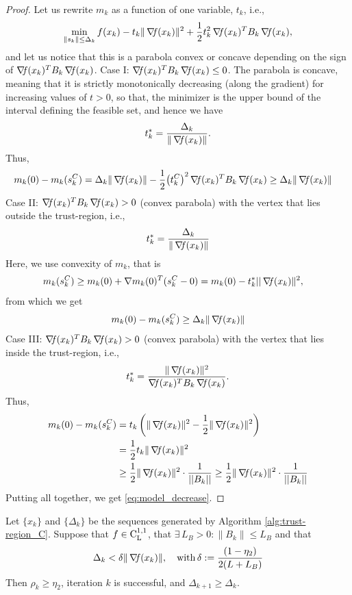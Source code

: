 \documentclass[10pt,a4paper]{article}
\begin{document}
\begin{proof}
	Let us rewrite $m_k$ as a function of one variable, $t_k$, i.e., 
	$$\min_{\|s_k\| \leq \Delta_k} f(x_k) -t_k \|\operatorname*{\mathit{\nabla \!f}}(x_k)\|^2 + \frac{1}{2}t_k^2\operatorname*{\mathit{\nabla \!f}}(x_k)^T B_k\operatorname*{\mathit{\nabla \!f}}(x_k),$$
	and let us notice that this is a parabola convex or concave depending on the sign of $\operatorname*{\mathit{\nabla \!f}}(x_k)^T B_k\operatorname*{\mathit{\nabla \!f}}(x_k)$. 
	Case I: $\operatorname*{\mathit{\nabla \!f}}(x_k)^T B_k \operatorname*{\mathit{\nabla \!f}}(x_k) \leq 0$. The parabola is concave, meaning that it is strictly monotonically decreasing (along the gradient) for increasing values of $t > 0$, so that, the minimizer is the upper bound of the interval defining the feasible set, and hence we have
	\begin{equation*}
		t^*_k = \frac{\Delta_k}{\|\operatorname*{\mathit{\nabla \!f}}(x_k)\|}.
	\end{equation*}
Thus, 
\begin{align*}
	m_k(0) - m_k(s_k^C) & = \Delta_k \|\operatorname*{\mathit{\nabla \!f}}(x_k)\| - \frac{1}{2}{\left(t_k^C\right)}^2\operatorname*{\mathit{\nabla \!f}}(x_k)^T B_k\operatorname*{\mathit{\nabla \!f}}(x_k) \geq \Delta_k \|\operatorname*{\mathit{\nabla \!f}}(x_k)\|
\end{align*}
	Case II: $\operatorname*{\mathit{\nabla \!f}}(x_k)^T B_k \operatorname*{\mathit{\nabla \!f}}(x_k) > 0$ (convex parabola) with the vertex that lies outside the trust-region, i.e., 
	\begin{equation*}
		t^*_k = \frac{\Delta_k}{\|\operatorname*{\mathit{\nabla \!f}}(x_k)\|}
	\end{equation*}
Here, we use convexity of $m_k$, that is 
\begin{align*}
	m_k(s_k^C) & \geq m_k(0) + \nabla m_k(0)^T(s_k^C-0) = m_k(0) - t_k^*||\operatorname*{\mathit{\nabla \!f}}(x_k)\|^2,
\end{align*}
from which we get 
$$m_k(0) - m_k(s_k^C) \geq \Delta_k \|\operatorname*{\mathit{\nabla \!f}}(x_k)\|$$
Case III: $\operatorname*{\mathit{\nabla \!f}}(x_k)^T B_k \operatorname*{\mathit{\nabla \!f}}(x_k) > 0$ (convex parabola) with the vertex that lies inside the trust-region, i.e., 
$$t^*_k = \frac{\|\operatorname*{\mathit{\nabla \!f}}(x_k)\|^2}{\operatorname*{\mathit{\nabla \!f}}(x_k)^T B_k \operatorname*{\mathit{\nabla \!f}}(x_k)}.$$
Thus, 
\begin{align*}
	m_k(0) - m_k(s_k^C) &=  t_k \left(\|\operatorname*{\mathit{\nabla \!f}}(x_k)\|^2 - \frac{1}{2} \|\operatorname*{\mathit{\nabla \!f}}(x_k)\|^2 \right)\\
	& = \frac{1}{2} t_k \|\operatorname*{\mathit{\nabla \!f}}(x_k)\|^2\\
	&\geq \frac{1}{2} \|\operatorname*{\mathit{\nabla \!f}}(x_k)\|^2 \cdot \frac{1}{||B_k||}\geq \frac{1}{2} \|\operatorname*{\mathit{\nabla \!f}}(x_k)\|^2 \cdot \frac{1}{||B_k||}
\end{align*}
Putting all together, we get \eqref{eq:model_decrease}.
\end{proof}

\begin{lemma}\label{lemma:successful_condition}
	Let $\{x_k\}$ and $\{\Delta_k\}$ be the sequences generated by Algorithm \ref{alg:trust-region_C}. Suppose that $f\in \mathord{\mathrm{C^{1,1}_{L}}}$, that $\exists \, L_B>0: \|B_k\| \leq L_B$ and that
	\begin{equation}\label{eq:successful_condition}
		\Delta_k < \delta\|\operatorname*{\mathit{\nabla \!f}}(x_k)\|, \quad \mathord{\mathrm{with }}\, \delta:=\frac{(1 - \eta_2)}{2(L + L_B)}
	\end{equation}
	Then $\rho_k \geq \eta_2$, iteration $k$ is successful, and $\Delta_{k+1} \geq \Delta_k$.
\end{lemma}
\end{document}
